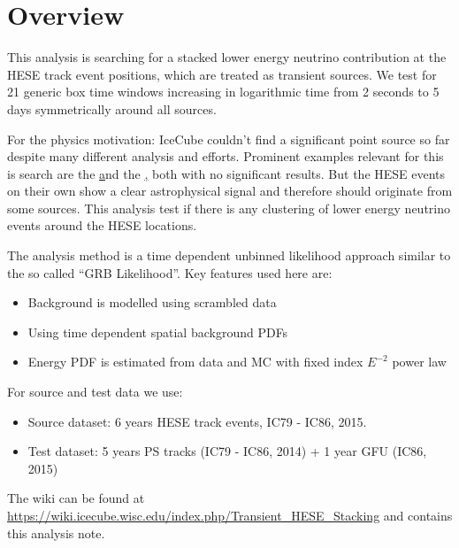 

% 






\tableofcontents
\newpage


\section{Overview}
This analysis is searching for a stacked lower energy neutrino contribution at the HESE track event positions, which are treated as transient sources.
We test for 21 generic box time windows increasing in logarithmic time from 2 seconds to 5 days symmetrically around all sources.

For the physics motivation: IceCube couldn't find a significant point source so far despite many different analysis and efforts.
Prominent examples relevant for this is search are the \href{time integrated 7 year point source search} and the \href{HESE 6 year point source search}, both with no significant results.
But the HESE events on their own show a clear astrophysical signal and therefore should originate from some sources.
This analysis test if there is any clustering of lower energy neutrino events around the HESE locations.

The analysis method is a time dependent unbinned likelihood approach similar to the so called \enquote{GRB Likelihood}.
Key features used here are:
\begin{itemize}
  \item Background is modelled using scrambled data
  \item Using time dependent spatial background PDFs
  \item Energy PDF is estimated from data and MC with fixed index $E^{-2}$ power law
\end{itemize}

For source and test data we use:
\begin{itemize}
  \item Source dataset: 6 years HESE track events, IC79 - IC86, 2015.
  \item Test dataset: 5 years PS tracks (IC79 - IC86, 2014) + 1 year GFU (IC86, 2015)
\end{itemize}

The wiki can be found at \url{https://wiki.icecube.wisc.edu/index.php/Transient_HESE_Stacking} and contains this analysis note.



